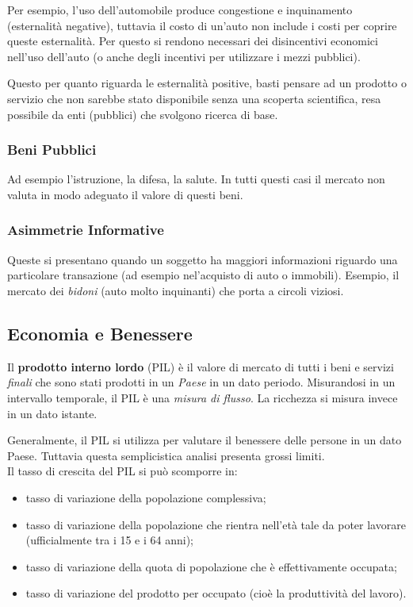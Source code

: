 \documentclass[a4paper,portrait,12pt]{article}
\theoremstyle{definition}
\begin{document}
Per esempio, l'uso dell'automobile produce congestione e inquinamento (esternalità negative), tuttavia il costo di un'auto non include i costi per coprire queste esternalità.
Per questo si rendono necessari dei disincentivi economici nell'uso dell'auto (o anche degli incentivi per utilizzare i mezzi pubblici).

Questo per quanto riguarda le esternalità positive, basti pensare ad un prodotto o servizio che non sarebbe stato disponibile senza una scoperta scientifica, resa possibile da enti (pubblici) che svolgono ricerca di base.

\subsubsection{Beni Pubblici}
Ad esempio l'istruzione, la difesa, la salute.
In tutti questi casi il mercato non valuta in modo adeguato il valore di questi beni.

\subsubsection{Asimmetrie Informative}
Queste si presentano quando un soggetto ha maggiori informazioni riguardo una particolare transazione (ad esempio nel'acquisto di auto o immobili).
Esempio, il mercato dei \emph{bidoni} (auto molto inquinanti) che porta a circoli viziosi.


\subsection{Economia e Benessere}

Il \textbf{prodotto interno lordo} (PIL) è il valore di mercato di tutti i beni e servizi \emph{finali} che sono stati prodotti in un \emph{Paese} in un dato periodo.
Misurandosi in un intervallo temporale, il PIL è una \emph{misura di flusso}.
La ricchezza si misura invece in un dato istante.

Generalmente, il PIL si utilizza per valutare il benessere delle persone in un dato Paese.
Tuttavia questa semplicistica analisi presenta grossi limiti.\\

Il tasso di crescita del PIL si può scomporre in:
\begin{itemize}
\item tasso di variazione della popolazione complessiva;
\item tasso di variazione della popolazione che rientra nell'età tale da poter lavorare (ufficialmente tra i 15 e i 64 anni);
\item tasso di variazione della quota di popolazione che è effettivamente occupata;
\item tasso di variazione del prodotto per occupato (cioè la produttività del lavoro).
\end{itemize}
\end{document}
